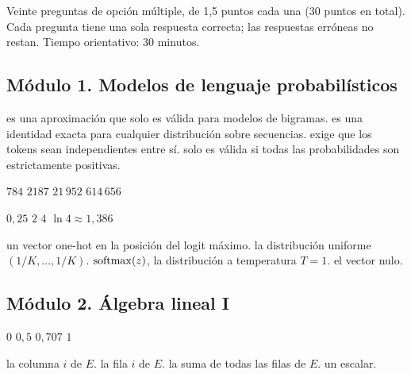 
Veinte preguntas de opción múltiple, de 1,5 puntos cada una (30 puntos en total). Cada pregunta tiene una sola respuesta correcta; las respuestas erróneas no restan. Tiempo orientativo: 30 minutos.

\subsection*{Módulo 1. Modelos de lenguaje probabilísticos}

{es una aproximación que solo es válida para modelos de bigramas.}
{es una identidad exacta para cualquier distribución sobre secuencias.}
{exige que los tokens sean independientes entre sí.}
{solo es válida si todas las probabilidades son estrictamente positivas.}

{$784$}
{$2187$}
{$21\,952$}
{$614\,656$}

{$0{,}25$}
{$2$}
{$4$}
{$\ln 4\approx 1{,}386$}

{un vector one-hot en la posición del logit máximo.}
{la distribución uniforme $(1/K,\dots,1/K)$.}
{$\operatorname{softmax}(z)$, la distribución a temperatura $T=1$.}
{el vector nulo.}

\subsection*{Módulo 2. Álgebra lineal I}

{$0$}
{$0{,}5$}
{$0{,}707$}
{$1$}

{la columna $i$ de $E$.}
{la fila $i$ de $E$.}
{la suma de todas las filas de $E$.}
{un escalar.}

